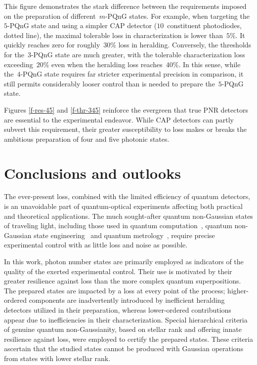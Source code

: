 \documentclass{optica-article}
\begin{document}
This figure demonstrates the stark difference between the requirements imposed on the preparation of different~$m$-PQnG states. For example, when targeting the~$5$-PQnG state and using a simpler CAP detector ($10$~constituent photodiodes, dotted line), the maximal tolerable loss in characterization is lower than~$5\%$. It quickly reaches zero for roughly~$30\%$ loss in heralding. Conversely, the thresholds for the~$3$-PQnG state are much greater, with the tolerable characterization loss exceeding~$20\%$ even when the heralding loss reaches~$40\%$. In this sense, while the~$4$-PQnG state requires far stricter experimental precision in comparison, it still permits considerably looser control than is needed to prepare the~$5$-PQnG state.

Figures \ref{f-res-45} and \ref{f-thr-345} reinforce the evergreen that true PNR detectors are essential to the experimental endeavor. While CAP detectors can partly subvert this requirement, their greater susceptibility to loss makes or breaks the ambitious preparation of four and five photonic states.

%

\FloatBarrier
\section{Conclusions and outlooks}

The ever-present loss, combined with the limited efficiency of quantum detectors, is an unavoidable part of quantum-optical experiments affecting both practical and theoretical applications. The much sought-after quantum non-Gaussian states of traveling light, including those used in quantum computation~\cite{lloyd1999,gottesman2001,menicucci2014,baragiola2019,bourassa2021,madsen2022,aghaeerad2025}, quantum non-Gaussian state engineering~\cite{filip2005,marek2009,marek2011,yukawa2013b,miyata2016,marek2018a,sakaguchi2023} and quantum metrology~\cite{kunitski2019,oh2020}, require precise experimental control with as little loss and noise as possible.

In this work, photon number states are primarily employed as indicators of the quality of the exerted experimental control. Their use is motivated by their greater resilience against loss than the more complex quantum superpositions. The prepared states are impacted by a loss at every point of the process; higher-ordered components are inadvertently introduced by inefficient heralding detectors utilized in their preparation, whereas lower-ordered contributions appear due to inefficiencies in their characterization. Special hierarchical criteria of genuine quantum non-Gaussianity, based on stellar rank and offering innate resilience against loss, were employed to certify the prepared states. These criteria ascertain that the studied states cannot be produced with Gaussian operations from states with lower stellar rank.
\end{document}
